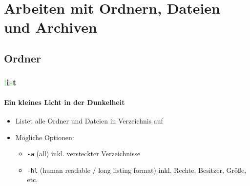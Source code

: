 \documentclass[12pt,utf8]{beamer}
\begin{document}

\section{Arbeiten mit Ordnern, Dateien und Archiven}
\subsection{Ordner}
\begin{frame}
	\frametitle{\textcolor{lightGreen}{l}i\textcolor{lightGreen}{s}t}
	\framesubtitle{Ein kleines Licht in der Dunkelheit}
	\begin{itemize}
		\item Listet alle Ordner und Dateien in Verzeichnis auf
		\item Mögliche Optionen:
		\begin{itemize}[<+->]
			\item \texttt{-a}  (all) inkl. versteckter Verzeichnisse
			\item \texttt{-hl}  (human readable / long listing format) inkl. Rechte, Besitzer, Größe, etc.
		\end{itemize}
	\end{itemize}
\end{frame}
\end{document}

